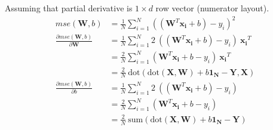 \documentclass[12pt, fleqn]{article}
\begin{document}
\subsubsection{}
Assuming that partial derivative is $1 \times d$ row vector (numerator layout).
\begin{equation*}
  \begin{aligned}
    mse(\mathbf{W},b)                                      & = \frac{1}{N} \sum_{i=1}^N ((\mathbf{W}^T \mathbf{x_i} + b) - y_i)^2                                     \\
    \frac{\partial mse(\mathbf{W},b)}{\partial \mathbf{W}} & = \frac{1}{N} \sum_{i=1}^N 2 \ ((\mathbf{W}^T \mathbf{x_i} + b) - y_i) \ \mathbf{x_i}^T                  \\
                                                           & = \frac{2}{N} \sum_{i=1}^N (\mathbf{W}^T \mathbf{x_i} + b - y_i) \ \mathbf{x_i}^T                        \\
                                                           & = \frac{2}{N} \ \text{dot}(\text{dot}(\mathbf{X}, \mathbf{W}) + b \mathbf{1_N} - \mathbf{Y}, \mathbf{X}) \\
    \frac{\partial mse(\mathbf{W},b)}{\partial b}          & = \frac{1}{N} \sum_{i=1}^N 2 \ ((\mathbf{W}^T \mathbf{x_i} + b) - y_i)                                   \\
                                                           & = \frac{2}{N} \sum_{i=1}^N (\mathbf{W}^T \mathbf{x_i} + b - y_i)                                         \\
                                                           & = \frac{2}{N} \ \text{sum}(\text{dot}(\mathbf{X}, \mathbf{W})  + b \mathbf{1_N} - \mathbf{Y})
  \end{aligned}
\end{equation*}
\end{document}
